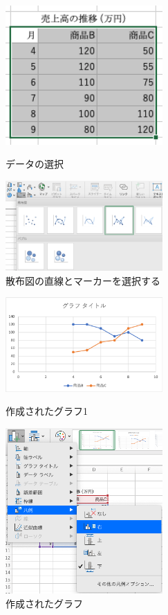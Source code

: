 \begin{figure}[tb]
    \begin{minipage}{0.5\hsize}
        \centering
        \includegraphics[width=6cm]{chap2/line_select_data.png}
        \caption{データの選択}
        \label{fig:line_select_data}
    \end{minipage}
    \begin{minipage}{0.5\hsize}
        \centering
        \includegraphics[width=6cm]{chap2/line_menu.png}
        \caption{散布図の直線とマーカーを選択する}
        \label{fig:line_menu}
    \end{minipage}
\end{figure}

\begin{figure}[tb]
    \begin{minipage}{0.5\hsize}
        \centering
        \includegraphics[width=6cm]{chap2/line1.png}
        \caption{作成されたグラフ1}
        \label{fig:line1}
    \end{minipage}
    \begin{minipage}{0.5\hsize}
        \centering
        \includegraphics[width=6cm]{chap2/line_hanrei.png}
        \caption{作成されたグラフ}
        \label{fig:line_hanrei}
    \end{minipage}
\end{figure}

